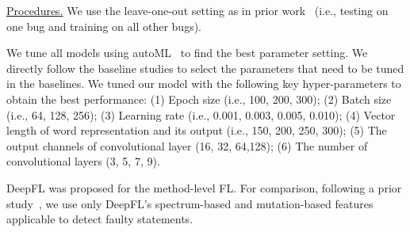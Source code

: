 \underline{Procedures.}
We use the leave-one-out setting as in prior work~\cite{DeepFL,
TraPT} (i.e., testing on one bug and training on all other bugs).







We tune all models using autoML~\cite{NNI} to find the best parameter
setting. We directly follow the baseline studies to select the
parameters that need to be tuned in the baselines.
We tuned our model with the following key hyper-parameters to obtain
the best performance: (1) Epoch size (i.e., 100, 200, 300); (2) Batch
size (i.e., 64, 128, 256); (3) Learning rate (i.e., 0.001, 0.003,
0.005, 0.010); (4) Vector length of word representation and its output
(i.e., 150, 200, 250, 300); (5) The output channels of convolutional
layer (16, 32, 64,128); (6) The number of convolutional layers (3, 5,
7, 9).



DeepFL was proposed for the method-level FL. For comparison, following
a prior study~\cite{icse21-fl}, we use only DeepFL's spectrum-based
and mutation-based features applicable to detect faulty statements.


